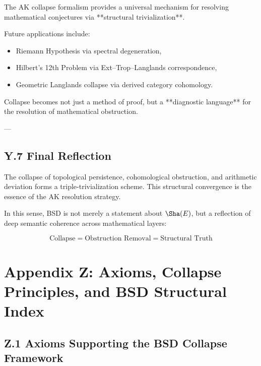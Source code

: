 The AK collapse formalism provides a universal mechanism  
for resolving mathematical conjectures via **structural trivialization**.  

Future applications include:
\begin{itemize}
  \item Riemann Hypothesis via spectral degeneration,
  \item Hilbert’s 12th Problem via Ext–Trop–Langlands correspondence,
  \item Geometric Langlands collapse via derived category cohomology.
\end{itemize}

Collapse becomes not just a method of proof,  
but a **diagnostic language** for the resolution of mathematical obstruction.

---

\subsection*{Y.7 Final Reflection}

The collapse of topological persistence, cohomological obstruction,  
and arithmetic deviation forms a triple-trivialization scheme.  
This structural convergence is the essence of the AK resolution strategy.

In this sense, BSD is not merely a statement about \( \Sha(E) \),  
but a reflection of deep semantic coherence across mathematical layers:

\[
\text{Collapse} = \text{Obstruction Removal} = \text{Structural Truth}
\]




\section*{Appendix Z: Axioms, Collapse Principles, and BSD Structural Index}

\subsection*{Z.1 Axioms Supporting the BSD Collapse Framework}

